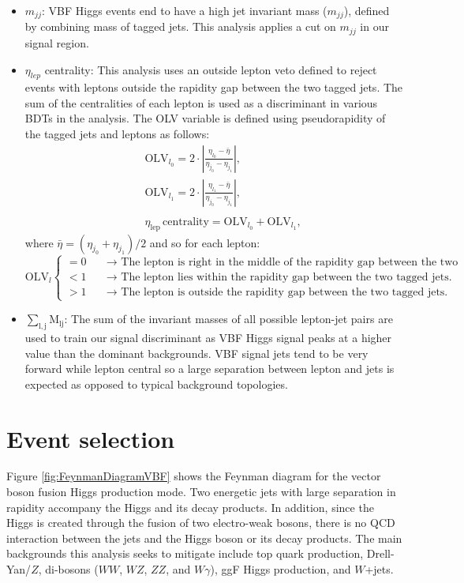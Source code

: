 \begin{itemize}
\item $m_{jj}$:
VBF Higgs events end to have a high jet invariant mass ($m_{jj}$), defined by combining mass of tagged jets. This analysis applies a cut on $m_{jj}$ in our signal region. 
\item $\eta_{lep}$ centrality: This analysis uses an outside lepton veto defined to reject events with leptons outside the rapidity gap between the two tagged jets. The sum of the centralities of each lepton is used as a discriminant in various BDTs in the analysis. The OLV variable is defined using pseudorapidity of the tagged jets and leptons as follows:
\begin{eqnarray}
&& \textrm{OLV}_{l_0} = 2 \cdot |\frac{\eta_{l_0}-\bar{\eta}}{\eta_{j_0}-\eta_{j_1}}|,  \nonumber\\
&& \textrm{OLV}_{l_1} = 2 \cdot |\frac{\eta_{l_1}-\bar{\eta}}{\eta_{j_0}-\eta_{j_1}}|,  \nonumber\\
&&\nonumber \\
&& \eta_{\mathrm{lep}} \, \textrm{centrality} = \textrm{OLV}_{l_0} + \textrm{OLV}_{l_1},
\label{eqn:contOLV_def}
\end{eqnarray}
where $\bar{\eta} = (\eta_{j_0} + \eta_{j_1})/2$ and so for each lepton: 
 \begin{equation}
   \textrm{OLV}_l \left\{
   \begin{array} {ll}
     = 0 & \quad \rightarrow \textrm{  The lepton is right in the middle of the rapidity gap between the two tagged jets.} \\
     < 1 & \quad \rightarrow \textrm{  The lepton lies within the rapidity gap between the two tagged jets.} \\
     >1  & \quad \rightarrow \textrm{   The lepton is outside the rapidity gap between the two tagged jets.} 
    \end{array} \right. 
 \end{equation}
\item $\mathrm{\sum_{l,j} M_{lj}}$: The sum of the invariant masses of all possible lepton-jet pairs are used to train our signal discriminant as VBF Higgs signal peaks at a higher value than the dominant backgrounds. VBF signal jets tend to be very forward while lepton central so a large separation between lepton and jets is expected as opposed to typical background topologies. 
\end{itemize}


\section{Event selection}
Figure \ref{fig:FeynmanDiagramVBF} shows the Feynman diagram for the vector boson fusion Higgs production mode. Two energetic jets with large separation in rapidity accompany the Higgs and its decay products. In addition, since the Higgs is created through the fusion of two electro-weak bosons, there is no QCD interaction between the jets and the Higgs boson or its decay products. The main backgrounds this analysis seeks to mitigate include top quark production, Drell-Yan/$Z$, di-bosons ($WW$, $WZ$, $ZZ$, and $W\gamma$), ggF Higgs production, and $W$+jets. 

